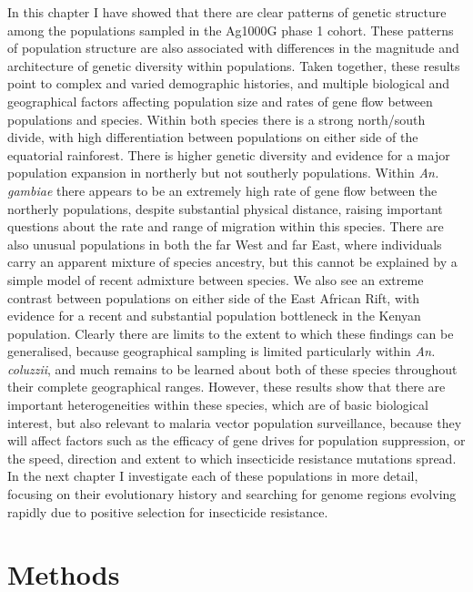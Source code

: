 \begin{refsection}
In this chapter I have showed that there are clear patterns of genetic structure among the populations sampled in the Ag1000G phase 1 cohort.
%
These patterns of population structure are also associated with differences in the magnitude and architecture of genetic diversity within populations.
%
Taken together, these results point to complex and varied demographic histories, and multiple biological and geographical factors affecting population size and rates of gene flow between populations and species.
%
Within both species there is a strong north/south divide, with high differentiation between populations on either side of the equatorial rainforest.
%
There is higher genetic diversity and evidence for a major population expansion in northerly but not southerly populations.
%
Within \textit{An. gambiae} there appears to be an extremely high rate of gene flow between the northerly populations, despite substantial physical distance, raising important questions about the rate and range of migration within this species.
%
There are also unusual populations in both the far West and far East, where individuals carry an apparent mixture of species ancestry, but this cannot be explained by a simple model of recent admixture between species.
%
We also see an extreme contrast between populations on either side of the East African Rift, with evidence for a recent and substantial population bottleneck in the Kenyan population.
%
Clearly there are limits to the extent to which these findings can be generalised, because geographical sampling is limited particularly within \textit{An. coluzzii}, and much remains to be learned about both of these species throughout their complete geographical ranges.
%
However, these results show that there are important heterogeneities within these species, which are of basic biological interest, but also relevant to malaria vector population surveillance, because they will affect factors such as the efficacy of gene drives for population suppression, or the speed, direction and extent to which insecticide resistance mutations spread.
%
In the next chapter I investigate each of these populations in more detail, focusing on their evolutionary history and searching for genome regions evolving rapidly due to positive selection for insecticide resistance.


\section{Methods}\label{sec:ch4-methods}



\end{refsection}
